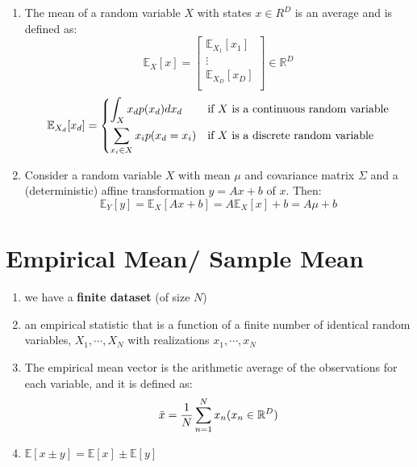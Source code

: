 \begin{enumerate}
    \item The mean of a random variable $X$ with states $x \in R^D$ is an average and is defined as: \cite{mfml-1}
    \[
        \mathbb{E}_X[x]
        = \begin{bmatrix}
            \mathbb{E}_{X_1}[x_1] \\
            \vdots \\
            \mathbb{E}_{X_D}[x_D] \\
        \end{bmatrix} \in \mathbb{R}^D
    \]
    \[
        \mathbb{E}_{X_d}[x_d]
        = \begin{cases}
            \displaystyle\int_X x_d p(x_d) dx_d
            & \text{if $X$ is a continuous random variable}\\[2ex]
            \displaystyle\sum_{x_i \in X} x_i p(x_d=x_i)
            & \text{if $X$ is a discrete random variable}
        \end{cases}
    \]

    \item Consider a random variable $X$ with mean $\mu$ and covariance matrix $\Sigma$ and a (deterministic) affine transformation $y = Ax + b$ of $x$. Then:
    \[
        \mathbb{E}_Y[y] 
        = \mathbb{E}_X[Ax + b] 
        = A\mathbb{E}_X[x] + b 
        = A\mu + b
    \]
\end{enumerate}

\section{Empirical Mean/ Sample Mean \cite{mfml-1}} \label{Multivariate Distributions: Empirical Mean/ Sample Mean}

\begin{enumerate}
    \item we have a \textbf{finite dataset} (of size $N$)

    \item an empirical statistic that is a function of a finite number of identical random variables, $X_1, \cdots , X_N$ with realizations $x_1, \cdots , x_N$

    \item The empirical mean vector is the arithmetic average of the observations for each variable, and it is defined as:
    \[
        \bar{x} = \dfrac{1}{N}
        \dsum_{n=1}^{N} x_n
        \hfill
        (x_n \in \mathbb{R}^D)
    \]

    \item $\mathbb{E}[x \pm y] = \mathbb{E}[x] \pm \mathbb{E}[y]$
\end{enumerate}


